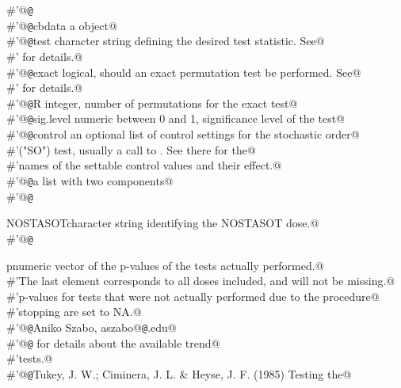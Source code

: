 \documentclass[reqno]{amsart}
\begin{document}
\begin{flushleft}
\begin{list}{}{}
\mbox{}\verb@#'@{\tt @}\verb@export@\\
\mbox{}\verb@#'@{\tt @}\verb@param cbdata a  object@\\
\mbox{}\verb@#'@{\tt @}\verb@param test character string defining the desired test statistic. See@\\
\mbox{}\verb@#' for details.@\\
\mbox{}\verb@#'@{\tt @}\verb@param exact logical, should an exact permutation test be performed. See@\\
\mbox{}\verb@#' for details.@\\
\mbox{}\verb@#'@{\tt @}\verb@param R integer, number of permutations for the exact test@\\
\mbox{}\verb@#'@{\tt @}\verb@param sig.level numeric between 0 and 1, significance level of the test@\\
\mbox{}\verb@#'@{\tt @}\verb@param control an optional list of control settings for the stochastic order@\\
\mbox{}\verb@#'("SO") test, usually a call to .  See there for the@\\
\mbox{}\verb@#'names of the settable control values and their effect.@\\
\mbox{}\verb@#'@{\tt @}\verb@return a list with two components@\\
\mbox{}\verb@#'@{\tt @}\verb@return \item{NOSTASOT}{character string identifying the NOSTASOT dose.}@\\
\mbox{}\verb@#'@{\tt @}\verb@return \item{p}{numeric vector of the p-values of the tests actually performed.}@\\
\mbox{}\verb@#'The last element corresponds to all doses included, and will not be missing.@\\
\mbox{}\verb@#'p-values for tests that were not actually performed due to the procedure@\\
\mbox{}\verb@#'stopping are set to NA.@\\
\mbox{}\verb@#'@{\tt @}\verb@author Aniko Szabo, aszabo@{\tt @}\verb@mcw.edu@\\
\mbox{}\verb@#'@{\tt @}\verb@seealso {} for details about the available trend@\\
\mbox{}\verb@#'tests.@\\
\mbox{}\verb@#'@{\tt @}\verb@references Tukey, J. W.; Ciminera, J. L. & Heyse, J. F. (1985) Testing the@\\

\end{list}
\end{flushleft}
\end{document}
